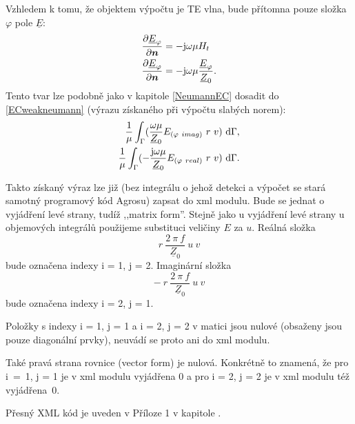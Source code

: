 \documentclass[12pt,a4paper,oneside]{article}
\numberwithin{equation}{section} %
\numberwithin{figure}{section} %
\numberwithin{table}{section} %
\newcommand{\mj}{\mathrm{j}} %
\renewcommand{\vec}[1]{\mbox{\boldmath$#1$}} %
\newcommand{\faz}[1]{{\underline{#1}}} %
\begin{document}
Vzhledem k tomu, že objektem výpočtu je TE vlna, bude přítomna pouze složka ${\varphi}$ pole $\faz{E}$:
\begin{subequations}
\begin{align}
\frac{\partial \faz{E} _{\varphi}}{\partial \vec{n}} &= - \mj \omega \mu H _t
\\
\frac{\partial \faz{E} _{\varphi}}{\partial \vec{n}} &= - \mj \omega \mu \frac{\faz{E} _{\varphi}}{\faz{Z} _0} .
\end{align}
\end{subequations}
Tento tvar lze podobně jako v kapitole \ref{NeumannEC} dosadit do \ref{ECweakneumann} (výrazu získaného při výpočtu slabých norem):
\begin{subequations}
\begin{align}
\frac{1}{\mu} \int _{\Gamma} ( \frac{\omega \mu}{\faz{Z} _0} E _{(\varphi ~ imag)} ~ r ~ v ) ~ \ud \Gamma ,
\\ 
\frac{1}{\mu} \int _{\Gamma} ( - \frac{\mj \omega \mu}{\faz{Z} _0} E _{(\varphi ~ real)} ~ r ~ v ) ~ \ud \Gamma .
\end{align}
\end{subequations}

Takto získaný výraz lze již (bez integrálu o jehož detekci a výpočet se stará samotný programový kód Agrosu) zapsat do xml modulu. Bude se jednat o vyjádření levé strany, tudíž ,,matrix form''. Stejně jako u vyjádření levé strany u objemových integrálů použijeme substituci veličiny $E$ za $u$. Reálná složka 
\begin{equation}
r ~\frac{2 ~ \pi ~ f}{\faz{Z} _0} ~ u ~ v
\end{equation} 
bude označena indexy i = 1, j = 2. Imaginární složka 
\begin{equation}
- ~ r ~ \frac{2 ~ \pi ~ f}{\faz{Z} _0} ~ u ~ v
\end{equation}
bude označena indexy i = 2, j = 1.

Položky s indexy i = 1, j = 1 a i = 2, j = 2 v matici jsou nulové (obsaženy jsou pouze diagonální prvky), neuvádí se proto ani do xml modulu.

Také pravá strana rovnice (vector form) je nulová. Konkrétně to znamená, že pro i~=~1, j = 1 je v xml modulu vyjádřena $0$ a pro i = 2, j = 2 je v xml modulu též vyjádřena~$0$.

Přesný XML kód je uveden v Příloze 1 v kapitole .
\end{document}
